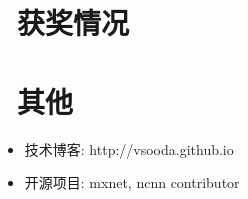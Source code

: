 \documentclass{resume}
\begin{document}
\section{\faHeartO\ 获奖情况}


\section{\faPencilSquare\ 其他}
\begin{itemize}[parsep=0.5ex]
  \item 技术博客: http://vsooda.github.io
  \item 开源项目: mxnet, ncnn contributor
\end{itemize}
\end{document}
